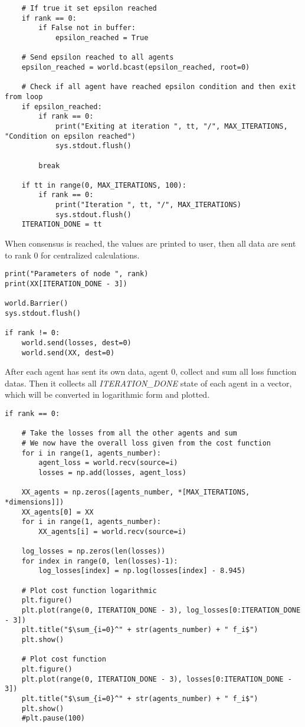 \documentclass[a4paper,11pt,oneside]{book}
\begin{document}
\begin{lstlisting}
    # If true it set epsilon reached
    if rank == 0:
        if False not in buffer:
            epsilon_reached = True

    # Send epsilon reached to all agents
    epsilon_reached = world.bcast(epsilon_reached, root=0)

    # Check if all agent have reached epsilon condition and then exit from loop
    if epsilon_reached:
        if rank == 0:
            print("Exiting at iteration ", tt, "/", MAX_ITERATIONS, "Condition on epsilon reached")
            sys.stdout.flush()

        break

    if tt in range(0, MAX_ITERATIONS, 100):
        if rank == 0:
            print("Iteration ", tt, "/", MAX_ITERATIONS)
            sys.stdout.flush()
    ITERATION_DONE = tt
\end{lstlisting}

When consensus is reached, the values are printed to user, then all data are sent to rank 0 for centralized calculations.

\begin{lstlisting}
print("Parameters of node ", rank)
print(XX[ITERATION_DONE - 3])

world.Barrier()
sys.stdout.flush()

if rank != 0:
    world.send(losses, dest=0)
    world.send(XX, dest=0)
\end{lstlisting}

After each agent has sent its own data, agent 0, collect and sum all loss function datas. Then it collects all \textit{ITERATION\_DONE} state of each
agent in a vector, which will be converted in logarithmic form and plotted.

\begin{lstlisting}
if rank == 0:

    # Take the losses from all the other agents and sum
    # We now have the overall loss given from the cost function
    for i in range(1, agents_number):
        agent_loss = world.recv(source=i)
        losses = np.add(losses, agent_loss)

    XX_agents = np.zeros([agents_number, *[MAX_ITERATIONS, *dimensions]])
    XX_agents[0] = XX
    for i in range(1, agents_number):
        XX_agents[i] = world.recv(source=i)

    log_losses = np.zeros(len(losses))
    for index in range(0, len(losses)-1):
        log_losses[index] = np.log(losses[index] - 8.945)

    # Plot cost function logarithmic
    plt.figure()
    plt.plot(range(0, ITERATION_DONE - 3), log_losses[0:ITERATION_DONE - 3])
    plt.title("$\sum_{i=0}^" + str(agents_number) + " f_i$")
    plt.show()

    # Plot cost function
    plt.figure()
    plt.plot(range(0, ITERATION_DONE - 3), losses[0:ITERATION_DONE - 3])
    plt.title("$\sum_{i=0}^" + str(agents_number) + " f_i$")
    plt.show()
    #plt.pause(100)
\end{lstlisting}
\end{document}
